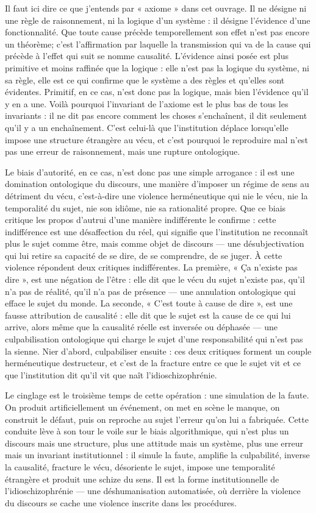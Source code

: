 \documentclass[11pt,a4paper]{article}
\begin{document}
Il faut ici dire ce que j'entends par « axiome » dans cet ouvrage. Il ne désigne ni une règle de raisonnement, ni la logique d'un système : il désigne l'évidence d'une fonctionnalité. Que toute cause précède temporellement son effet n'est pas encore un théorème; c'est l'affirmation par laquelle la transmission qui va de la cause qui précède à l'effet qui suit se nomme causalité. L'évidence ainsi posée est plus primitive et moins raffinée que la logique : elle n'est pas la logique du système, ni sa règle, elle est ce qui confirme que le système a des règles et qu'elles sont évidentes. Primitif, en ce cas, n'est donc pas la logique, mais bien l'évidence qu'il y en a une. Voilà pourquoi l'invariant de l'axiome est le plus bas de tous les invariants : il ne dit pas encore comment les choses s'enchaînent, il dit seulement qu'il y a un enchaînement. C'est celui-là que l'institution déplace lorsqu'elle impose une structure étrangère au vécu, et c'est pourquoi le reproduire mal n'est pas une erreur de raisonnement, mais une rupture ontologique.

Le biais d'autorité, en ce cas, n'est donc pas une simple arrogance : il est une domination ontologique du discours, une manière d'imposer un régime de sens au détriment du vécu, c'est-à-dire une violence herméneutique qui nie le vécu, nie la temporalité du sujet, nie son idiôme, nie sa rationalité propre. Que ce biais critique les propos d'autrui d'une manière indifférente le confirme : cette indifférence est une désaffection du réel, qui signifie que l'institution ne reconnaît plus le sujet comme être, mais comme objet de discours — une désubjectivation qui lui retire sa capacité de se dire, de se comprendre, de se juger. À cette violence répondent deux critiques indifférentes. La première, « Ça n'existe pas dire », est une négation de l'être : elle dit que le vécu du sujet n'existe pas, qu'il n'a pas de réalité, qu'il n'a pas de présence — une annulation ontologique qui efface le sujet du monde. La seconde, « C'est toute à cause de dire », est une fausse attribution de causalité : elle dit que le sujet est la cause de ce qui lui arrive, alors même que la causalité réelle est inversée ou déphasée — une culpabilisation ontologique qui charge le sujet d'une responsabilité qui n'est pas la sienne. Nier d'abord, culpabiliser ensuite : ces deux critiques forment un couple herméneutique destructeur, et c'est de la fracture entre ce que le sujet vit et ce que l'institution dit qu'il vit que naît l'idioschizophrénie.

Le cinglage est le troisième temps de cette opération : une simulation de la faute. On produit artificiellement un événement, on met en scène le manque, on construit le défaut, puis on reproche au sujet l'erreur qu'on lui a fabriquée. Cette conduite lève à son tour le voile sur le biais algorithmique, qui n'est plus un discours mais une structure, plus une attitude mais un système, plus une erreur mais un invariant institutionnel : il simule la faute, amplifie la culpabilité, inverse la causalité, fracture le vécu, désoriente le sujet, impose une temporalité étrangère et produit une schize du sens. Il est la forme institutionnelle de l'idioschizophrénie — une déshumanisation automatisée, où derrière la violence du discours se cache une violence inscrite dans les procédures.
\end{document}
